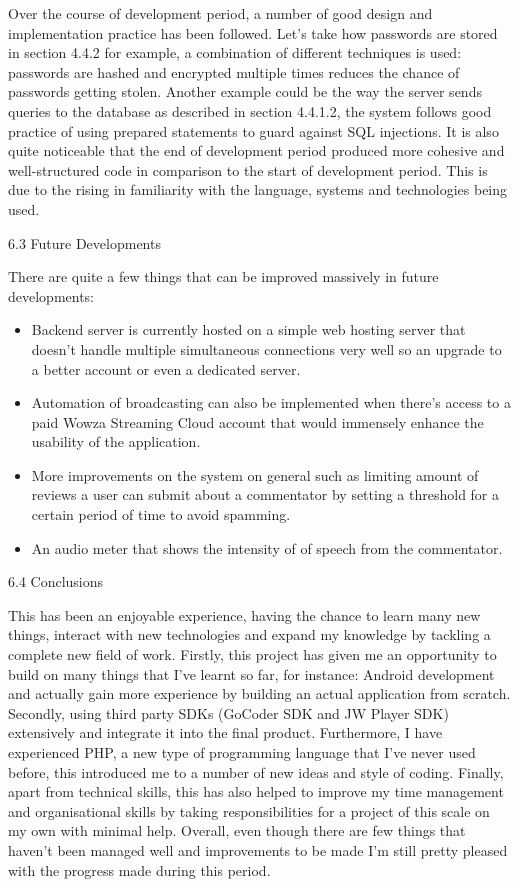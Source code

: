 \documentclass{article}
\begin{document}
\begin{flushleft}
Over the course of development period, a number of good design and implementation practice has been followed. Let's take how passwords are stored in section 4.4.2 for example, a combination of different techniques is used: passwords are hashed and encrypted multiple times reduces the chance of passwords getting stolen. Another example could be the way the server sends queries to the database as described in section 4.4.1.2, the system follows good practice of using prepared statements to guard against SQL injections. It is also quite noticeable that the end of development period produced more cohesive and well-structured code in comparison to the start of development period. This is due to the rising in familiarity with the language, systems and technologies being used. \par
{\Large 6.3 Future Developments}\par
There are quite a few things that can be improved massively in future developments:
\begin{itemize}
	\item Backend server is currently hosted on a simple web hosting server that doesn't handle multiple simultaneous connections very well so an upgrade to a better account or even a dedicated server.
	\item Automation of broadcasting can also be implemented when there's access to a paid Wowza Streaming Cloud account that would immensely enhance the usability of the application.
	\item More improvements on the system on general such as limiting amount of reviews a user can submit about a commentator by setting a threshold for a certain period of time to avoid spamming.
	\item An audio meter that shows the intensity of of speech from the commentator. 
\end{itemize}
{\Large 6.4 Conclusions}\par
This has been an enjoyable experience, having the chance to learn many new things, interact with new technologies and expand my knowledge by tackling a complete new field of work. Firstly, this project has given me an opportunity to build on many things that I've learnt so far, for instance: Android development and actually gain more experience by building an actual application from scratch. Secondly, using third party SDKs (GoCoder SDK and JW Player SDK) extensively and integrate it into the final product. Furthermore, I have experienced PHP, a new type of programming language that I've never used before, this introduced me to a number of new ideas and style of coding. Finally, apart from technical skills, this has also helped to improve my time management and organisational skills by taking responsibilities for a project of this scale on my own with minimal help. Overall, even though there are few things that haven't been managed well and improvements to be made I'm still pretty pleased with the progress made during this period.\par

\end{flushleft}
\end{document}
